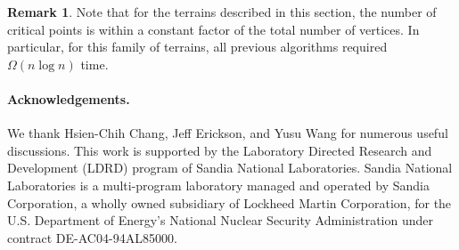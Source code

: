 \documentclass[11pt]{article}
\newcommand{\myparagraph}[1]{\paragraph{#1}}
\theoremstyle{definition}
\newtheorem{Remark}[theorem]{Remark}
\begin{document}
\begin{Remark}
 Note that for the terrains described in this section, the number of critical points is within a constant factor of 
 the total number of vertices.  In particular, for this family of terrains, all previous algorithms required $\Omega(n\log n)$ time.
\end{Remark}





\myparagraph{Acknowledgements.}
We thank Hsien-Chih Chang, Jeff Erickson, and Yusu Wang for numerous useful discussions. This work is
supported by the Laboratory Directed Research and Development
(LDRD) program of Sandia National Laboratories. Sandia National
Laboratories is a multi-program laboratory managed and operated
by Sandia Corporation, a wholly owned subsidiary of Lockheed
Martin Corporation, for the U.S. Department of Energy's National
Nuclear Security Administration under contract DE-AC04-94AL85000.






%
%
%
%
\end{document}
